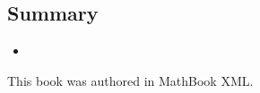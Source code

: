 \documentclass[10pt,]{book}
\theoremstyle{plain}
\theoremstyle{definition}
\theoremstyle{definition}
\theoremstyle{definition}
\theoremstyle{definition}
\theoremstyle{definition}
\numberwithin{equation}{section}
\begin{document}
\subsection[{Summary}]{Summary}\label{subsection-11}
\leavevmode%
\begin{itemize}[label=\textbullet]
\item{}%
\end{itemize}
%
\backmatter
%
%
%
%
\printindex
%
\cleardoublepage
\pagestyle{empty}
\centerline{This book was authored in MathBook XML.%
}
\end{document}
